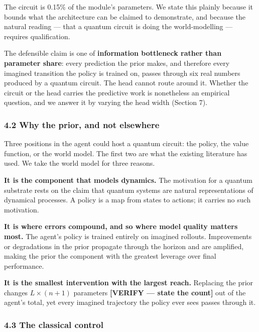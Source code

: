 \documentclass[
  11pt]{article}
\begin{document}
The circuit is 0.15\% of the module's parameters. We state this plainly
because it bounds what the architecture can be claimed to demonstrate,
and because the natural reading --- that a quantum circuit is doing the
world-modelling --- requires qualification.

The defensible claim is one of \textbf{information bottleneck rather
than parameter share}: every prediction the prior makes, and therefore
every imagined transition the policy is trained on, passes through six
real numbers produced by a quantum circuit. The head cannot route around
it. Whether the circuit or the head carries the predictive work is
nonetheless an empirical question, and we answer it by varying the head
width (Section 7).

\hypertarget{why-the-prior-and-not-elsewhere}{%
\subsubsection{4.2 Why the prior, and not
elsewhere}\label{why-the-prior-and-not-elsewhere}}

Three positions in the agent could host a quantum circuit: the policy,
the value function, or the world model. The first two are what the
existing literature has used. We take the world model for three reasons.

\textbf{It is the component that models dynamics.} The motivation for a
quantum substrate rests on the claim that quantum systems are natural
representations of dynamical processes. A policy is a map from states to
actions; it carries no such motivation.

\textbf{It is where errors compound, and so where model quality matters
most.} The agent's policy is trained entirely on imagined rollouts.
Improvements or degradations in the prior propagate through the horizon
and are amplified, making the prior the component with the greatest
leverage over final performance.

\textbf{It is the smallest intervention with the largest reach.}
Replacing the prior changes \(L \times (n+1)\) parameters
\textbf{{[}VERIFY --- state the count{]}} out of the agent's total, yet
every imagined trajectory the policy ever sees passes through it.

\hypertarget{the-classical-control}{%
\subsubsection{4.3 The classical control}\label{the-classical-control}}
\end{document}
